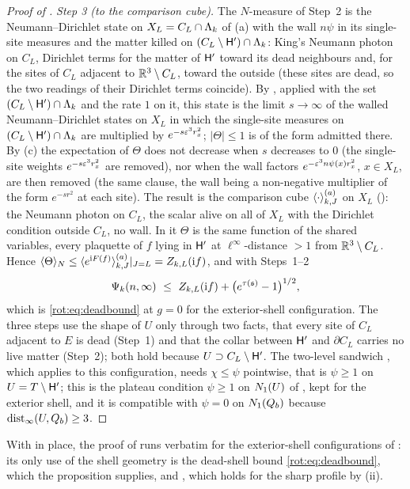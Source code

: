\begin{proof}[Proof of ]
\emph{Step 3 (to the comparison cube).} The $N$-measure of Step~2 is the Neumann--Dirichlet state on $X_L=C_L\cap\Lambda_k$ of (a) with the wall $n\psi$ in its single-site measures and the matter killed on $(C_L\setminus\mathsf H')\cap\Lambda_k$: King's Neumann photon on $C_L$, Dirichlet terms for the matter of $\mathsf H'$ toward its dead neighbours and, for the sites of $C_L$ adjacent to $\mathbb R^3\setminus C_L$, toward the outside (these sites are dead, so the two readings of their Dirichlet terms coincide). By , applied with the set $(C_L\setminus\mathsf H')\cap\Lambda_k$ and the rate $1$ on it, this state is the limit $s\to\infty$ of the walled Neumann--Dirichlet states on $X_L$ in which the single-site measures on $(C_L\setminus\mathsf H')\cap\Lambda_k$ are multiplied by $e^{-s\varepsilon^3r_x^2}$; $|\Theta|\le1$ is of the form admitted there. By (c) the expectation of $\Theta$ does not decrease when $s$ decreases to $0$ (the single-site weights $e^{-s\varepsilon^3r_x^2}$ are removed), nor when the wall factors $e^{-\varepsilon^3n\psi(x)r_x^2}$, $x\in X_L$, are then removed (the same clause, the wall being a non-negative multiplier of the form $e^{-sr^2}$ at each site). The result is the comparison cube $\langle \cdot\rangle^{(a)}_{k,J}$ on $X_L$ (): the Neumann photon on $C_L$, the scalar alive on all of $X_L$ with the Dirichlet condition outside $C_L$, no wall. In it $\Theta$ is the same function of the shared variables, every plaquette of $f$ lying in $\mathsf H'$ at $\ell^\infty$-distance $>1$ from $\mathbb R^3\setminus C_L$. Hence $\langle\Theta\rangle_N\le\langle e^{\mathrm iF(f)}\rangle^{(a)}_{k,J}|_{J=L}=Z_{k,L}(\mathrm if)$, and with Steps~1--2
\[
\Psi_k(n,\infty)\ \le\ Z_{k,L}(\mathrm if)+\big(e^{\tau(\mathfrak s)}-1\big)^{1/2},
\]
which is \eqref{rot:eq:deadbound} at $g=0$ for the exterior-shell configuration. The three steps use the shape of $U$ only through two facts, that every site of $C_L$ adjacent to $E$ is dead (Step~1) and that the collar between $\mathsf H'$ and $\partial C_L$ carries no live matter (Step~2); both hold because $U\supset C_L\setminus\mathsf H'$. The two-level sandwich , which  applies to this configuration, needs $\chi\le\psi$ pointwise, that is $\psi\ge1$ on $U=T\setminus\mathsf H'$; this is the plateau condition $\psi\ge1$ on $N_{1}(U)$ of , kept for the exterior shell, and it is compatible with $\psi=0$ on $N_{1}(Q_{b})$ because $\operatorname{dist}_\infty(U,Q_{b})\ge3$.
\end{proof}

With  in place, the proof of  runs verbatim for the exterior-shell configurations of : its only use of the shell geometry is the dead-shell bound \eqref{rot:eq:deadbound}, which the proposition supplies, and , which holds for the sharp profile by (ii).
